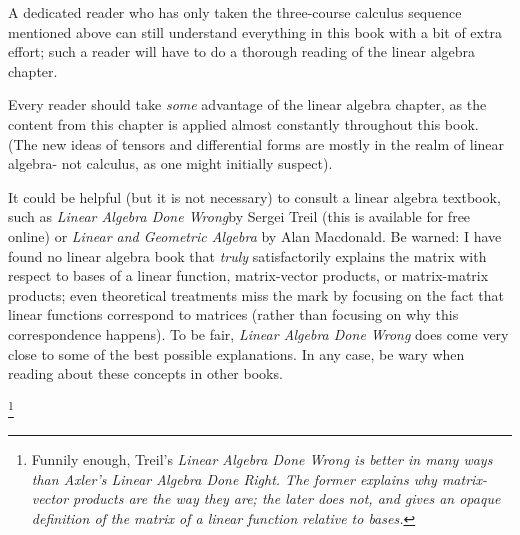 A dedicated reader who has only taken the three-course calculus sequence mentioned above can still understand everything in this book with a bit of extra effort; such a reader will have to do a thorough reading of the linear algebra chapter.

Every reader should take \textit{some} advantage of the linear algebra chapter, as the content from this chapter is applied almost constantly throughout this book. (The new ideas of tensors and differential forms are mostly in the realm of linear algebra- not calculus, as one might initially suspect).

It could be helpful (but it is not necessary) to consult a linear algebra textbook, such as \textit{Linear Algebra Done Wrong}\footnotemark by Sergei Treil (this is available for free online) or \textit{Linear and Geometric Algebra} by Alan Macdonald. Be warned: I have found no linear algebra book that \textit{truly} satisfactorily explains the matrix with respect to bases of a linear function, matrix-vector products, or matrix-matrix products; even theoretical treatments miss the mark by focusing on the fact that linear functions correspond to matrices (rather than focusing on why this correspondence happens). To be fair, \textit{Linear Algebra Done Wrong} does come very close to some of the best possible explanations. In any case, be wary when reading about these concepts in other books.

\footnote{Funnily enough, Treil's \textit{Linear Algebra Done Wrong is better in many ways than Axler's \textit{Linear Algebra Done Right}. The former explains why matrix-vector products are the way they are; the later does not, and gives an opaque definition of the matrix of a linear function relative to bases.}}